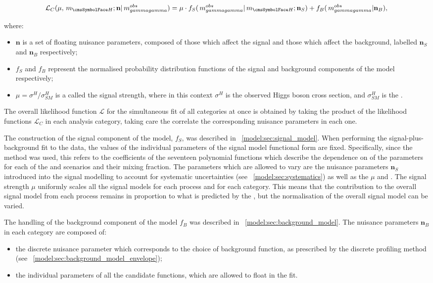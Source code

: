 \begin{equation}
\label{eq:statandresults:likelihood_function}
\mathcal{L}_C(\mu, \mH; \mathbf{n} | \mgg^{obs} ) = \mu \cdot f_S(\mgg^{obs} |\mH ; \mathbf{n}_S) + f_B(\mgg^{obs} | \mathbf{n}_B ), 
\end{equation}

where: 
\begin{itemize}
\item $\mathbf{n}$ is a set of floating nuisance parameters, composed of those which affect the signal and those which affect the background, labelled $\mathbf{n}_S$ and $\mathbf{n}_B$ respectively; 
\item $f_S$ and $f_B$ represent the normalised probability distribution functions of the signal and background components of the model respectively; 
\item $\mu = \sigma^{H} / \sigma^{H}_{SM}$ is a \POI called the signal strength, where in this context $\sigma^H$ is the observed Higgs boson cross section, and $\sigma^H_{SM}$ is the \SM \crosssection. 
\end{itemize}
The overall likelihood function $\mathcal{L}$ for the simultaneous fit of all categories at once is obtained by taking the product of the likelihood functions $\mathcal{L}_C$ in each analysis category, taking care the correlate the corresponding nuisance parameters in each one.

The construction of the signal component of the model, $f_S$, was described in \Sec~\ref{model:sec:signal_model}. When performing the signal-plus-background fit to the data, the values of the individual parameters of the signal model functional form are fixed. Specifically, since the \SSF method was used, this refers to the coefficients of the seventeen polynomial functions which describe the dependence on \mH of the \DCBpG parameters for each of the \RV and \WV scenarios and their mixing fraction. The parameters which are allowed to vary are the nuisance parameters  $\mathbf{n}_S$  introduced into the signal modelling to account for systematic uncertainties (see \Sec~\ref{model:sec:systematics}) as well as the \POI\s $\mu$ and \mH. The signal strength $\mu$ uniformly scales all the signal models for each process and for each category. This means that the contribution to the overall signal model from each process remains in proportion to what is predicted by the \SM, but the normalisation of the overall signal model can be varied. 

The handling of the background component of the model $f_B$ was described in \Sec~\ref{model:sec:background_model}. The nuisance parameters $\mathbf{n}_B$ in each category are composed of:
\begin{itemize}
\item the discrete nuisance parameter which corresponds to the choice of background function, as prescribed by the discrete profiling method (see \Sec~\ref{model:sec:background_model_envelope}); 
\item the individual parameters of all the candidate functions, which are allowed to float in the fit.
\end{itemize}

